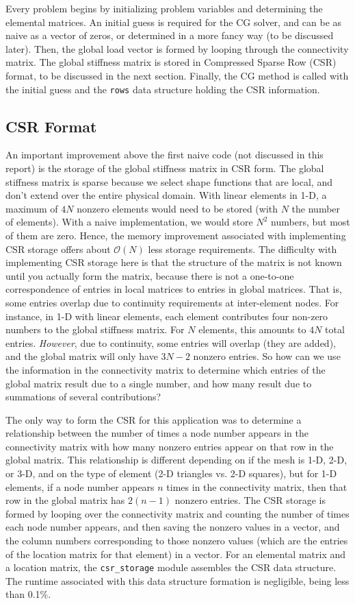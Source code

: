 \documentclass[10pt]{article}
\begin{document}
Every problem begins by initializing problem variables and determining the elemental matrices. An initial guess is required for the CG solver, and can be as naive as a vector of zeros, or determined in a more fancy way (to be discussed later). Then, the global load vector is formed by looping through the connectivity matrix. The global stiffness matrix is stored in Compressed Sparse Row (CSR) format, to be discussed in the next section. Finally, the CG method is called with the initial guess and the {\tt rows} data structure holding the CSR information. 

\subsection{CSR Format}
An important improvement above the first naive code (not discussed in this report) is the storage of the global stiffness matrix in CSR form. The global stiffness matrix is sparse because we select shape functions that are local, and don't extend over the entire physical domain. With linear elements in 1-D, a maximum of \(4N\) nonzero elements would need to be stored (with \(N\) the number of elements). With a naive implementation, we would store \(N^2\) numbers, but most of them are zero. Hence, the memory improvement associated with implementing CSR storage offers about \(\mathscr{O}(N)\) less storage requirements. The difficulty with implementing CSR storage here is that the structure of the matrix is not known until you actually form the matrix, because there is not a one-to-one correspondence of entries in local matrices to entries in global matrices. That is, some entries overlap due to continuity requirements at inter-element nodes. For instance, in 1-D with linear elements, each element contributes four non-zero numbers to the global stiffness matrix. For \(N\) elements, this amounts to \(4N\) total entries. {\it However}, due to continuity, some entries will overlap (they are added), and the global matrix will only have \(3N-2\) nonzero entries. So how can we use the information in the connectivity matrix to determine which entries of the global matrix result due to a single number, and how many result due to summations of several contributions?

The only way to form the CSR for this application was to determine a relationship between the number of times a node number appears in the connectivity matrix with how many nonzero entries appear on that row in the global matrix. This relationship is different depending on if the mesh is 1-D, 2-D, or 3-D, and on the type of element (2-D triangles vs. 2-D squares), but for 1-D elements, if a node number appears \(n\) times in the connectivity matrix, then that row in the global matrix has \(2(n-1)\) nonzero entries. The CSR storage is formed by looping over the connectivity matrix and counting the number of times each node number appears, and then saving the nonzero values in a vector, and the column numbers corresponding to those nonzero values (which are the entries of the location matrix for that element) in a vector. For an elemental matrix and a location matrix, the {\tt csr\_storage} module assembles the CSR data structure. The runtime associated with this data structure formation is negligible, being less than 0.1\%.
\end{document}
